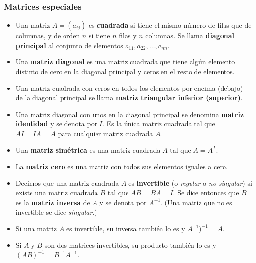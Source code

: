 \documentclass[12pt]{article}
\begin{document}
\subsubsection{Matrices especiales}
\begin{itemize}

\item Una matriz $ A = (a_{ij}) $ es \textbf{cuadrada} si tiene el mismo número de filas que de columnas, y de orden $ n $ si tiene $ n $ filas y $ n $ columnas. Se llama \textbf{diagonal principal} al conjunto de elementos $ a_{11}, a_{22}, \ldots, a_{nn} $.

\item Una \textbf{matriz diagonal} es una matriz cuadrada que tiene algún elemento distinto de cero en la diagonal principal y ceros en el resto de elementos.

\item Una matriz cuadrada con ceros en todos los elementos por encima (debajo) de la diagonal principal se llama \textbf{matriz triangular inferior (superior)}.

\item Una matriz diagonal con unos en la diagonal principal se denomina \textbf{matriz identidad} y se denota por $I$. Es la única matriz cuadrada tal que $ AI = IA = A $ para cualquier matriz cuadrada $A$.

\item Una \textbf{matriz simétrica} es una matriz cuadrada $A$ tal que $A=A^T$.

\item La \textbf{matriz cero} es una matriz con todos sus elementos iguales a cero.

\item Decimos que una matriz cuadrada $A$ es \textbf{invertible} (o \textit{regular} o \textit{no singular}) si existe una matriz cuadrada $ B $ tal que $AB = BA = I$. Se dice entonces que $ B $ es la \textbf{matriz inversa} de $A$ y se denota por $A^{-1}$. (Una matriz que no es invertible se dice \textit{singular}.)

\item Si una matriz $ A $ es invertible, su inversa también lo es y $A^{-1})^{-1} = A$.

\item Si $A$ y $B$ son dos matrices invertibles, su producto también lo es y $(AB)^{-1} = B^{-1}A^{-1}$.
\end{itemize}
\end{document}
